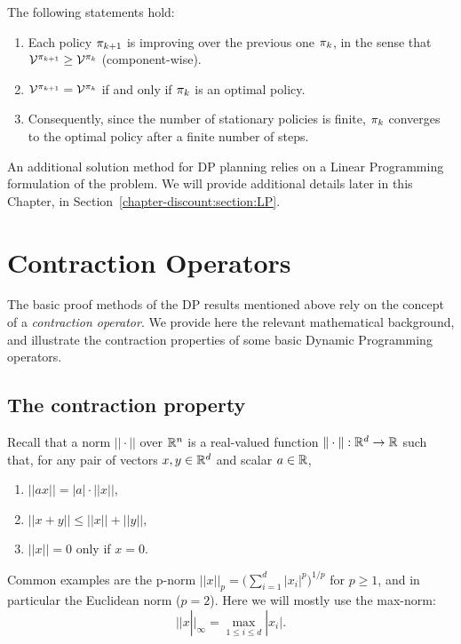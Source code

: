 \begin{theorem}\label{thm:_PI}
The following statements hold:
\begin{enumerate}
  \item Each policy ${\pi _{k + 1}}$ is improving over the previous one ${\pi _k}$, in the sense that ${\mathcal{V}^{{\pi _{k + 1}}}} \ge {\mathcal{V}^{{\pi_k}}}$ (component-wise).
  \item ${\mathcal{V}^{{\pi _{k + 1}}}} = {\mathcal{V}^{{\pi _k}}}$ if and only if ${\pi _k}$ is an optimal policy.
  \item Consequently, since the number of stationary policies is finite, ${\pi _k}$ converges to the optimal policy after a finite number of steps.
\end{enumerate}
\end{theorem}

An additional solution method for DP planning relies on a Linear
Programming formulation of the problem.
We will provide additional details later in this
Chapter, in Section~\ref{chapter-discount:section:LP}.

\section{Contraction Operators}

The basic proof methods of the DP results mentioned above rely on
the concept of a \emph{contraction operator}. We provide here the
relevant mathematical background, and illustrate the contraction
properties of some basic Dynamic Programming operators.

\subsection{The contraction property}
Recall that a norm $|| \cdot ||$ over $\mathbb{R}^n$  is a real-valued
function $\|\cdot\| : \mathbb{R}^d \to \mathbb R$ such that, for any
pair of vectors $x,y \in \mathbb{R}^d$  and scalar $a\in\mathbb{R}$,
\begin{enumerate}
  \item $||ax|| = |a| \cdot ||x||$,
  \item $||x + y|| \le ||x|| + ||y||$,
  \item $||x|| = 0$ only if $x = 0$.
\end{enumerate}

Common examples are the p-norm $||x|{|_p} = (\sum\nolimits_{i = 1}^d
{{{|{x_i}|}^p}{)^{1/p}}} $ for $p \ge 1$, and in particular the
Euclidean norm ($p = 2$). Here we will mostly use the max-norm:
\[||x|{|_\infty } = {\max _{1 \le i \le d}}|{x_i}|.\]

